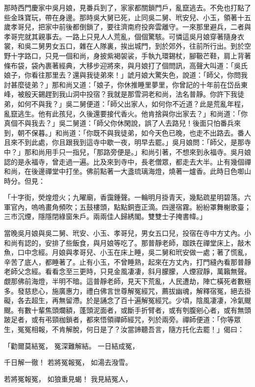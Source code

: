 那時西門慶家中吳月娘，見番兵到了，家家都關鎖門戶，亂竄逃去。不免也打點了些金珠寶玩，帶在身邊。那時吳大舅已死，止同吳二舅、玳安兒、小玉，領著十五歲孝哥兒，把家中前後都倒鎖了，要往濟南府投奔雲離守。一來那里避兵，二者與孝哥完就其親事去。一路上只見人人荒亂，個個驚駭。可憐這吳月娘穿著隨身衣裳，和吳二舅男女五口，雜在人隊裏，挨出城門，到於郊外，往前所行出。到於空野十字路口，只見一個和尚，身披紫褐袈裟，手執九環錫杖，腳靸芒鞋，肩上背著條布袋，袋內裹著經典，大移步迎將來，與月娘打了個問訊，高聲大叫道：「吳氏娘子，你看往那里去？還與我徒弟來！」諕月娘大驚失色，說道：「師父，你問我討甚麼徒弟？」那和尚又道：「娘子，你休推睡里夢里，你曾記的十年前在岱岳東峰，被殷天錫趕到我山洞中投宿？我就是那雪洞老和尚，法名普靜。你許下我徒弟，如何不與我？」吳二舅便道：「師父出家人，如何你不近道？此是荒亂年程，亂竄逃生。他有此孩兒，久後還要接代香火。他肯捨與你出家去？」和尚道：「你真個不與我去？」吳二舅道：「師父你休閑說，誤了人去路兒！後面只怕番兵來到，朝不保暮。」和尚道：「你既不與我徒弟，如今天色已晚，也走不出路去。番人且來不到此處，你且跟我到這寺中歇一夜，明早去罷。」吳月娘問：「師父，是那寺中？」那和尚用手只一指兒，「那路旁便是。」和尚引著，不想來到永福寺。吳月娘認的是永福寺，曾走過一遍。比及來到寺中，長老僧眾，都走去大半。止有幾個禪和尚，在後邊禪堂中打坐。佛前點著一大盞琉璃海燈，燒著一爐香。此時日色啣山時分。但見：

「十字街，熒煌燈火；九曜廟，香靄鍾聲。一輪明月掛青天，幾點疏星明碧落。六軍官內，嗚嗚畫角頻吹；五鼓樓頭，點點銅壼正滴。四邊宿霧。紛紛罩舞榭歌臺；三巿沉煙，隱隱閉綠窗朱戶。兩兩佳人歸綉閣。雙雙士子掩書幃。」

當晚吳月娘與吳二舅、玳安、小玉、孝哥兒，男女五口兒，投宿在寺中方丈內。小和尚有認的，安排了些飯食，與月娘等吃了。那普靜老師，跏跌在禪堂床上，敲木魚，口中念經。月娘與孝哥兒、小玉在床上睡，吳二舅和玳安做一處；著了慌亂，辛苦了底人，都睡著了。止有小玉，不曾睡熟，起來在方丈內，打門縫內看那普靜老師父念經。看看念至三更時，只見金風凄凄，斜月朦朦，人煙寂靜，萬籟無聲。覷那佛前海燈，半明不暗。這普靜老師，見天下荒亂，人民遭劫，陣亡橫死者數極多。發慈悲心，施廣惠力，禮白佛言世尊解冤經咒，薦拔幽魂，解釋宿冤，絕去掛礙，各去超生，再無留滯。於是誦念了百十遍解冤經咒。少頃，陰風凄凄，冷氣颼颼。有數十輩焦頭爛額，蓬頭泥面者，或斷手折臂者，或有刳腹剜心者，或有無頭跛足者，或有弔頸枷鎖者，都來悟領禪師經咒，列於兩旁。禪師便道：「你等眾生，冤冤相報，不肯解脫，何日是了？汝當諦聽吾言，隨方托化去罷！」偈曰：

「勸爾莫結冤，  冤深難解結。  一日結成冤，

千日解一徹！  若將冤報冤，  如湯去潑雪。

若將冤報冤，  如狼重見蝎！  我見結冤人，

